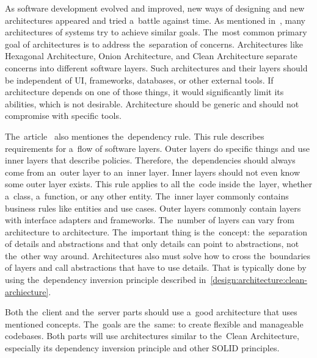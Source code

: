 As software development evolved and improved, new ways of designing and new architectures appeared and tried a~battle against time.
As mentioned in~\cite{a2021_clean_architecture_blog}, many architectures of systems try to achieve similar goals.
The~most common primary goal of architectures is to address the~separation of concerns.
Architectures like Hexagonal Architecture, Onion Architecture, and Clean Architecture separate concerns into different software layers.
Such architectures and their layers should be independent of UI, frameworks, databases, or other external tools.
If architecture depends on one of those things, it would significantly limit its abilities, which is not desirable.
Architecture should be generic and should not compromise with specific tools.

The~article~\cite{a2021_clean_architecture_blog} also mentiones the~dependency rule.
This rule describes requirements for a~flow of software layers.
Outer layers do specific things and use inner layers that describe policies.
Therefore, the~dependencies should always come from an~outer layer to an~inner layer.
Inner layers should not even know some outer layer exists.
This rule applies to all the~code inside the~layer, whether a~class, a~function, or any other entity.
The~inner layer commonly contains business rules like entities and use cases.
Outer layers commonly contain layers with interface adapters and frameworks.
The~number of layers can vary from architecture to architecture.
The~important thing is the~concept: the~separation of details and abstractions and that only details can point to abstractions, not the~other way around.
Architectures also must solve how to cross the~boundaries of layers and call abstractions that have to use details.
That is typically done by using the~dependency inversion principle described in~\ref{design:architecture:clean-archiecture}.

Both the~client and the~server parts should use a~good architecture that uses mentioned concepts.
The~goals are the~same: to create flexible and manageable codebases.
Both parts will use architectures similar to the~Clean Architecture, especially its dependency inversion principle and other SOLID principles.

